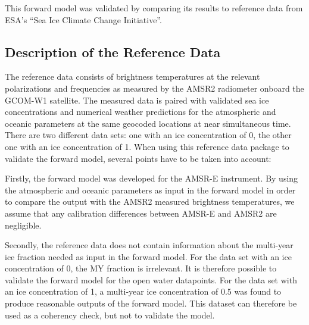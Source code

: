 \documentclass[11pt, a4paper]{article}
\begin{document}
This forward model was validated by comparing its results to reference data from ESA's ``Sea Ice Climate Change Initiative''.



\subsection{Description of the Reference Data}

The reference data consists of brightness temperatures at the relevant polarizations and frequencies as measured by the AMSR2 radiometer onboard the GCOM-W1 satellite. %
The measured data is paired with validated sea ice concentrations and numerical weather predictions for the atmospheric and oceanic parameters at the same geocoded locations at near simultaneous time. There are two different data sets: one with an ice concentration of 0, the other one with an ice concentration of 1. When using this reference data package to validate the forward model, several points have to be taken into account:
\newline

Firstly, the forward model was developed for the AMSR-E instrument. By using the atmospheric and oceanic parameters as input in the forward model in order to compare the output with the AMSR2 measured brightness temperatures, we assume that any calibration differences between AMSR-E and AMSR2 are negligible. %
\newline

Secondly, the reference data does not contain information about the multi-year ice fraction needed as input in the forward model. %
For the data set with an ice concentration of 0, the MY fraction is irrelevant. It is therefore possible to validate the forward model for the open water datapoints. For the data set with an ice concentration of 1, %
a multi-year ice concentration of 0.5 was found to produce reasonable outputs of the forward model. This dataset can therefore be used as a coherency check, but not to validate the model.
\newline
\end{document}
